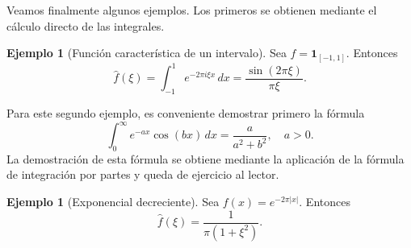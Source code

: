 \documentclass[12pt, a4paper]{amsbook}
\theoremstyle{remark}
\theoremstyle{definition}
\newtheorem{ejem}[teo]{Ejemplo}
\numberwithin{section}{chapter}
\numberwithin{subsection}{section}
\numberwithin{equation}{section}
\numberwithin{figure}{chapter}
\begin{document}
Veamos finalmente algunos ejemplos. Los primeros se obtienen mediante el cálculo directo de las integrales.

\begin{ejem}[Función característica de un intervalo]\label{ej:indicadora}
Sea $f=\mathbf{1}_{[-1,1]}$. Entonces
\[
\hat f(\xi)=\int_{-1}^{1}e^{-2\pi i \xi x}\,dx
=\frac{\sin(2\pi\xi)}{\pi\xi}.
\]
\end{ejem}

Para este segundo ejemplo, es conveniente demostrar primero la fórmula
$$
\int_0^\infty e^{-ax}\cos(bx)\, dx = \frac{a}{a^2+b^2},\quad a>0.
$$
La demostración de esta fórmula se obtiene mediante la aplicación de la fórmula de integración por partes y queda de ejercicio al lector.
\begin{ejem}[Exponencial decreciente]\label{ej:exponencial}
Sea $f(x)=e^{-2\pi|x|}$. Entonces
\[
\hat f(\xi)=\frac{1}{\pi(1+\xi^2)}.
\]
\end{ejem}
\end{document}
